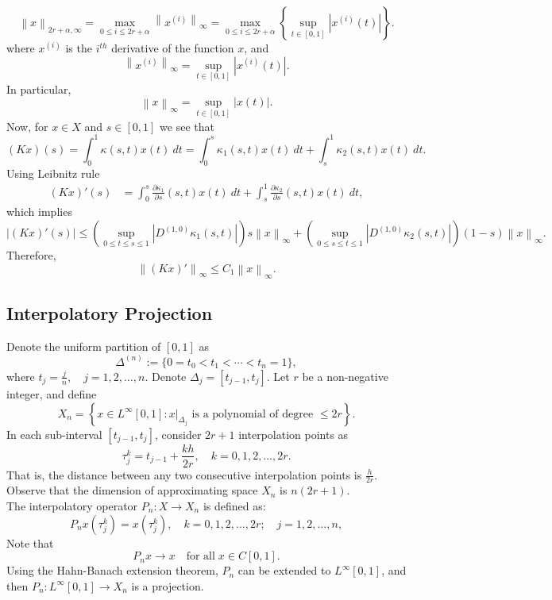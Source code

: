 \documentclass[sn-mathphys-num]{sn-jnl}%
\theoremstyle{thmstyleone}%
\theoremstyle{thmstyletwo}%
\theoremstyle{thmstylethree}%
\newcommand{\norm}[1]{\left\lVert #1\right\rVert}
\begin{document}
\begin{equation*}
	\norm{x}_{2r + \alpha, \infty} = \max_{0 \le i \le 2r +\alpha} \norm{x^{(i)}}_\infty = \max_{0 \le i \le 2r +\alpha} \left\{ \sup_{t \in [0,1]}  \left|x^{(i)}(t)\right| \right\}.
\end{equation*}   
where $x^{(i)}$ is the $i^{th}$ derivative of the function $x$, and
$$
\norm{x^{(i)}}_\infty =  \sup_{t \in [0,1]}  \left|x^{(i)}(t)\right|.
$$
In particular, 
$$
\norm{x}_\infty =  \sup_{t \in [0,1]}  \left|x(t)\right|.
$$
Now, for $x \in X$ and $s \in [0,1]$ we see that
$$
(Kx)(s) = \int_{0}^{1} \kappa(s, t) x(t)~dt= \int_{0}^{s} \kappa_1(s, t) x(t)~dt + \int_{s}^{1} \kappa_2(s, t) x(t)~dt.
$$
Using Leibnitz rule
\begin{align*}
	(Kx)'(s) &= \int_{0}^{s} \frac{\partial \kappa_1}{\partial s}(s, t) x(t)~dt + \int_{s}^{1} \frac{\partial \kappa_2}{\partial s}(s, t) x(t)~dt,
\end{align*}
which implies
$$
| (Kx)'(s) | \le \left( \sup_{0 \le t \le s \le 1} \left| D^{(1,0)} \kappa_1(s,t) \right|  \right) s \norm{x}_\infty +  \left( \sup_{0 \le s \le t \le 1} \left| D^{(1,0)} \kappa_2(s,t) \right|  \right) (1-s) \norm{x}_\infty. 
$$
Therefore, 
\begin{equation} \label{Eq: 3}
	\norm{(Kx)'}_\infty \le C_1 \norm{x}_\infty.
\end{equation}


\subsection{Interpolatory Projection}
Denote the uniform partition of $[0,1]$ as
$$
\Delta^{(n)} := \{ 0 =t_0 < t_1 < \cdots <t_n=1\},
$$ 
where $t_j = \displaystyle{\frac{j}{n}}, \quad j=1,2, \ldots, n$. Denote $\Delta_{j} = [t_{j-1}, t_j]$. Let $r$ be a non-negative integer, and define
$$
X_n = \left\{x \in L^\infty[0, 1] : x|_{\Delta_{j}} \text{ is a polynomial of degree } \leq 2r \right\}. 
$$
In each sub-interval $[t_{j-1}, t_j]$, consider $2r+1$ interpolation points as
$$
\tau_j^k = t_{j-1} + \frac{kh}{2r}, \quad k = 0, 1, 2, \ldots, 2r.
$$
That is, the distance between any two consecutive interpolation points is $\frac{h}{2r}$. Observe that the dimension of approximating space $X_n$ is $n(2r+1)$.\\
The interpolatory operator $P_n : X \to X_n$ is defined as:
\begin{equation} \label {Eq: 4}
	P_nx(\tau_j^k) = x(\tau_j^k), \quad k = 0, 1, 2, \ldots, 2r; \quad j = 1, 2, \ldots, n,
\end{equation}
Note that \[P_nx \to x \quad \text{for all} \; x \in C[0,1].\]
Using the Hahn-Banach extension theorem, $P_n$ can be extended to $L^\infty[0,1]$, and then $P_n : L^\infty[0,1] \to X_n$ is a projection.
\end{document}
